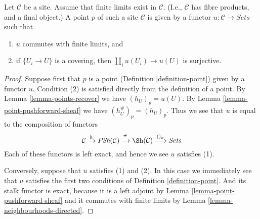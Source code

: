 \begin{proposition}
\label{proposition-point-limits}
Let $\mathcal{C}$ be a site. Assume that finite limits exist
in $\mathcal{C}$. (I.e., $\mathcal{C}$ has fibre products, and a
final object.) A point $p$ of such a site $\mathcal{C}$
is given by a functor $u : \mathcal{C} \to \textit{Sets}$ such that
\begin{enumerate}
\item $u$ commutes with finite limits, and
\item if $\{U_i \to U\}$ is a covering, then
$\coprod_i u(U_i) \to u(U)$ is surjective.
\end{enumerate}
\end{proposition}

\begin{proof}
Suppose first that $p$ is a point (Definition \ref{definition-point})
given by a functor $u$. Condition (2) is satisfied directly from
the definition of a point. By Lemma \ref{lemma-points-recover}
we have $(h_U)_p = u(U)$. By Lemma \ref{lemma-point-pushforward-sheaf}
we have $(h_U^\#)_p = (h_U)_p$. Thus we see that $u$
is equal to the composition of functors
$$
\mathcal{C} \xrightarrow{h}
\textit{PSh}(\mathcal{C}) \xrightarrow{{}^\#}
\Sh(\mathcal{C}) \xrightarrow{()_p}
\textit{Sets}
$$
Each of these functors is left exact, and hence we see $u$ satisfies (1).

\medskip\noindent
Conversely, suppose that $u$ satisfies (1) and (2).
In this case we immediately see that $u$ satisfies the first two
conditions of Definition \ref{definition-point}. And its
stalk functor is exact, because it is a left adjoint by
Lemma \ref{lemma-point-pushforward-sheaf} and it commutes
with finite limits by Lemma \ref{lemma-neighbourhoods-directed}.
\end{proof}

